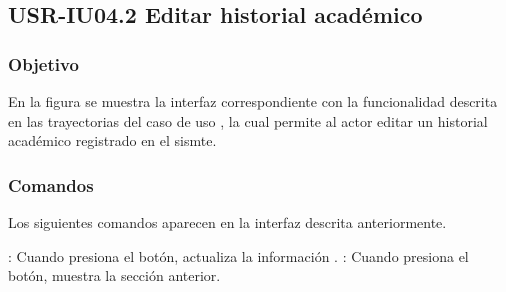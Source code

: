 \clearpage
\subsection{USR-IU04.2 Editar historial académico}

\subsubsection{Objetivo}
En la figura  se muestra la interfaz correspondiente con la funcionalidad descrita en las
trayectorias del caso de uso  , la cual permite al actor editar un historial académico registrado en el sismte.

\subsubsection{Comandos}
Los siguientes comandos aparecen en la interfaz descrita anteriormente.

\Titem {} : Cuando presiona el botón, actualiza la información .
\Titem {} : Cuando presiona el botón, muestra la sección anterior.%



\clearpage
